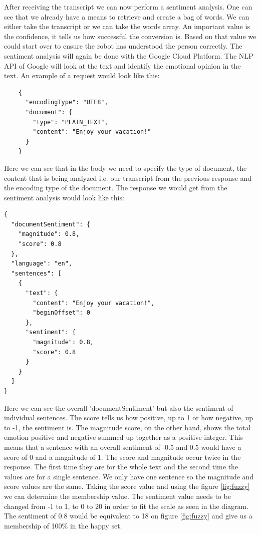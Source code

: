 \documentclass{lncs}
\begin{document}
After receiving the transcript we can now perform a sentiment analysis. One can see that we already have a means to retrieve and create a bag of words. We can either take the transcript or we can take the words array. An important value is the confidence, it tells us how successful the conversion is. Based on that value we could start over to ensure the robot has understood the person correctly. The sentiment analysis will again be done with the Google Cloud Platform. The NLP API of Google will look at the text and identify the emotional opinion in the text. An example of a request would look like this: 

\begin{verbatim}
	{
	  "encodingType": "UTF8",
	  "document": {
	    "type": "PLAIN_TEXT",
	    "content": "Enjoy your vacation!"
	  }
	}
\end{verbatim}

Here we can see that in the body we need to specify the type of document, the content that is being analyzed i.e. our transcript from the previous response and the encoding type of the document. The response we would get from the sentiment analysis would look like this:

\begin{verbatim}
{
  "documentSentiment": {
    "magnitude": 0.8,
    "score": 0.8
  },
  "language": "en",
  "sentences": [
    {
      "text": {
        "content": "Enjoy your vacation!",
        "beginOffset": 0
      },
      "sentiment": {
        "magnitude": 0.8,
        "score": 0.8
      }
    }
  ]
}

\end{verbatim}

Here we can see the overall 'documentSentiment' but also the sentiment of individual sentences. The score tells us how positive, up to 1 or how negative, up to -1, the sentiment is. The magnitude score, on the other hand, shows the total emotion positive and negative summed up together as a positive integer. This means that a sentence with an overall sentiment of -0.5 and 0.5 would have a score of 0 and a magnitude of 1. The score and magnitude occur twice in the response. The first time they are for the whole text and the second time the values are for a single sentence. We only have one sentence so the magnitude and score values are the same. Taking the score value and using the figure \ref{fig:fuzzy} we can determine the membership value. The sentiment value needs to be changed from -1 to 1, to 0 to 20 in order to fit the scale as seen in the diagram. The sentiment of 0.8 would be equivalent to 18 on figure \ref{fig:fuzzy} and give us a membership of 100\% in the happy set.
\end{document}
